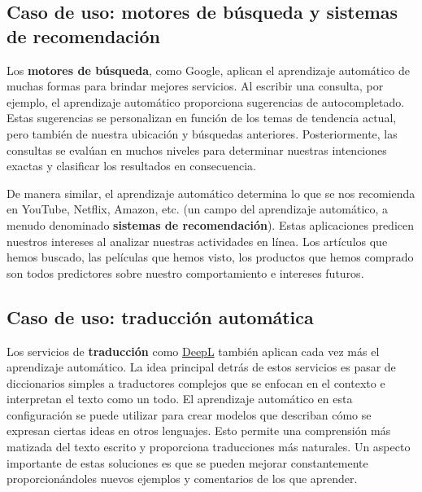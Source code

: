 \documentclass[
]{book}
\begin{document}
\hypertarget{caso-de-uso-motores-de-buxfasqueda-y-sistemas-de-recomendaciuxf3n}{%
\subsection{Caso de uso: motores de búsqueda y sistemas de recomendación}\label{caso-de-uso-motores-de-buxfasqueda-y-sistemas-de-recomendaciuxf3n}}

Los \textbf{motores de búsqueda}, como Google, aplican el aprendizaje automático de muchas formas para brindar mejores servicios. Al escribir una consulta, por ejemplo, el aprendizaje automático proporciona sugerencias de autocompletado. Estas sugerencias se personalizan en función de los temas de tendencia actual, pero también de nuestra ubicación y búsquedas anteriores. Posteriormente, las consultas se evalúan en muchos niveles para determinar nuestras intenciones exactas y clasificar los resultados en consecuencia.

De manera similar, el aprendizaje automático determina lo que se nos recomienda en YouTube, Netflix, Amazon, etc. (un campo del aprendizaje automático, a menudo denominado \textbf{sistemas de recomendación}). Estas aplicaciones predicen nuestros intereses al analizar nuestras actividades en línea. Los artículos que hemos buscado, las películas que hemos visto, los productos que hemos comprado son todos predictores sobre nuestro comportamiento e intereses futuros.

\hypertarget{caso-de-uso-traducciuxf3n-automuxe1tica}{%
\subsection{Caso de uso: traducción automática}\label{caso-de-uso-traducciuxf3n-automuxe1tica}}

Los servicios de \textbf{traducción} como \href{https://www.deepl.com/en/translator}{DeepL} también aplican cada vez más el aprendizaje automático. La idea principal detrás de estos servicios es pasar de diccionarios simples a traductores complejos que se enfocan en el contexto e interpretan el texto como un todo. El aprendizaje automático en esta configuración se puede utilizar para crear modelos que describan cómo se expresan ciertas ideas en otros lenguajes. Esto permite una comprensión más matizada del texto escrito y proporciona traducciones más naturales. Un aspecto importante de estas soluciones es que se pueden mejorar constantemente proporcionándoles nuevos ejemplos y comentarios de los que aprender.
\end{document}
